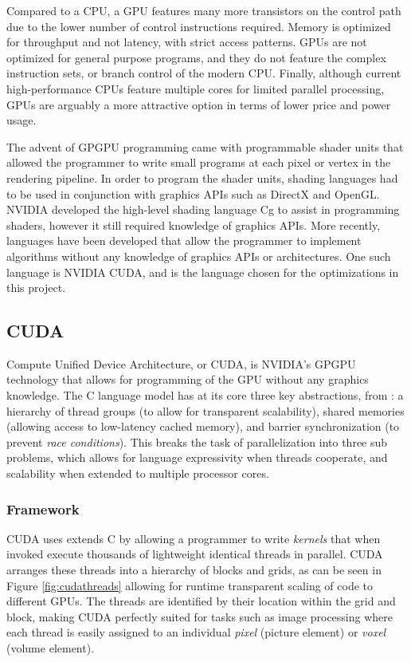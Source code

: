 Compared to a CPU, a GPU features many more transistors on the control path due to the lower number of control instructions required. Memory is optimized for throughput and not latency, with strict access patterns. GPUs are not optimized for general purpose programs, and they do not feature the complex instruction sets, or branch control of the modern CPU. Finally, although current high-performance CPUs feature multiple cores for limited parallel processing, GPUs are arguably a more attractive option in terms of lower price and power usage.

The advent of GPGPU programming came with programmable shader units that allowed the programmer to write small programs at each pixel or vertex in the rendering pipeline. In order to program the shader units, shading languages had to be used in conjunction with graphics APIs such as DirectX and OpenGL. NVIDIA developed the high-level shading language Cg to assist in programming shaders, however it still required knowledge of graphics APIs. More recently, languages have been developed that allow the programmer to implement algorithms without any knowledge of graphics APIs or architectures. One such language is NVIDIA CUDA, and is the language chosen for the optimizations in this project.

	\subsection{CUDA}
Compute Unified Device Architecture, or CUDA, is NVIDIA's GPGPU technology that allows for programming of the GPU without any graphics knowledge. The C language model has at its core three key abstractions, from \cite{cuda}: a hierarchy of thread groups (to allow for transparent scalability), shared memories (allowing access to low-latency cached memory), and barrier synchronization (to prevent \textit{race conditions}). This breaks the task of parallelization into three sub problems, which allows for language expressivity when threads cooperate, and scalability when extended to multiple processor cores.

		\subsubsection{Framework}
CUDA uses extends C by allowing a programmer to write \textit{kernels} that when invoked execute thousands of lightweight identical threads in parallel. CUDA arranges these threads into a hierarchy of blocks and grids, as can be seen in Figure \ref{fig:cudathreads} allowing for runtime transparent scaling of code to different GPUs. The threads are identified by their location within the grid and block, making CUDA perfectly suited for tasks such as image processing where each thread is easily assigned to an individual \textit{pixel} (picture element) or \textit{voxel} (volume element).

